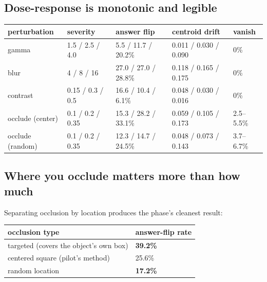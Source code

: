 \subsection{Dose-response is monotonic and legible}

\begin{center}
\begin{tabular}{p{3.2cm}p{2.0cm}p{2.4cm}p{2.4cm}p{2.2cm}}
\toprule
\textbf{perturbation} & \textbf{severity} & \textbf{answer flip} & \textbf{centroid drift} & \textbf{vanish} \\
\midrule
gamma            & 1.5 / 2.5 / 4.0    & 5.5 / 11.7 / 20.2\% & 0.011 / 0.030 / 0.090 & 0\% \\
blur             & 4 / 8 / 16         & 27.0 / 27.0 / 28.8\% & 0.118 / 0.165 / 0.175 & 0\% \\
contrast         & 0.15 / 0.3 / 0.5   & 16.6 / 10.4 / 6.1\%  & 0.048 / 0.030 / 0.016 & 0\% \\
occlude (center) & 0.1 / 0.2 / 0.35   & 15.3 / 28.2 / 33.1\% & 0.059 / 0.105 / 0.173 & 2.5--5.5\% \\
occlude (random) & 0.1 / 0.2 / 0.35   & 12.3 / 14.7 / 24.5\% & 0.048 / 0.073 / 0.143 & 3.7--6.7\% \\
\bottomrule
\end{tabular}
\label{tab:p24-dose}
\end{center}

\subsection{Where you occlude matters more than how much}

Separating occlusion by location produces the phase's cleanest result:

\begin{center}
\begin{tabular}{p{6.2cm}p{3.4cm}}
\toprule
\textbf{occlusion type} & \textbf{answer-flip rate} \\
\midrule
targeted (covers the object's own box)   & \textbf{39.2\%} \\
centered square (pilot's method)         & 25.6\% \\
random location                          & \textbf{17.2\%} \\
\bottomrule
\end{tabular}
\label{tab:p24-occ}
\end{center}

